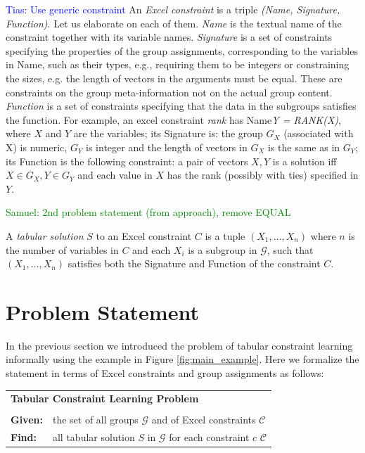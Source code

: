 \documentclass{ecai}
\newcommand{\samuel}[1]{\textcolor{green}{{\sc Samuel:} #1}\xspace}
\newcommand{\tias}[1]{\textcolor{blue}{{\sc Tias:} #1}\xspace}
\newcommand{\constraints}{\ensuremath{\mathcal{C}}\xspace}
\newcommand{\CName}{Name\xspace}
\newcommand{\CSignature}{Signature\xspace}
\newcommand{\CFunction}{Function\xspace}
\newcommand{\groups}{\ensuremath{\mathcal{G}}\xspace}
\begin{document}
\tias{Use generic constraint}
An \textit{Excel constraint} is a triple \textit{(\CName, \CSignature, \CFunction)}. Let us elaborate on each of them. \textit{\CName} is the textual name of the constraint together with its variable names. \textit{\CSignature} is a set of constraints specifying the properties of the group assignments, corresponding to the variables in \CName, such as their types, e.g., requiring them to be integers or constraining the sizes, e.g. the length of vectors in the arguments must be equal. These are constraints on the group meta-information not on the actual group content. \textit{\CFunction} is a set of constraints specifying that the data in the subgroups satisfies the function. For example, an excel constraint \textit{rank} has \CName \textit{Y = RANK(X)}, where $X$ and $Y$ are the variables; its \CSignature is: the group $G_X$ (associated with X) is numeric, $G_Y$ is integer and the length of vectors in $G_X$ is the same as in $G_Y$; its \CFunction is the following constraint: a pair of vectors $X,Y$ is a solution iff $X \in G_X, Y \in G_Y$ and each value in $X$ has the rank (possibly with ties) specified in $Y$.

\samuel{2nd problem statement (from approach), remove EQUAL}

A \textit{tabular solution} $S$ to an Excel constraint $C$ is a tuple $(X_1, \dots, X_n)$ where $n$ is the number of variables in $C$ and each $X_i$ is a subgroup in \groups, such that $(X_1,\dots,X_n)$ satisfies both the \CSignature and \CFunction of the constraint $C$.

\section{Problem Statement}
In the previous section we introduced the problem of tabular constraint learning informally using the example in Figure \ref{fig:main_example}. Here we formalize the statement in terms of Excel constraints and group assignments as follows: 

\begin{minipage}[c]{14em}
  \vspace{5pt}
  \begin{tabular}{ll}
    \multicolumn{2}{l}{{\textbf{Tabular Constraint Learning Problem}}}\\
    \vspace{-4pt}
    &\\
    \textbf{Given:}& the set of all groups $\groups$ and of Excel constraints $\constraints$\\
    \textbf{Find:}&  all tabular solution $S$ in \groups for each constraint $c$ \constraints \\ 
  \end{tabular}
  \vspace{6pt}
\end{minipage}
\end{document}
